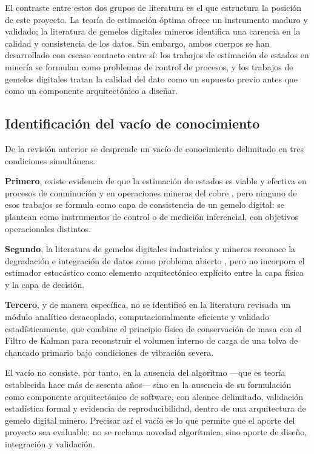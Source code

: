 El contraste entre estos dos grupos de literatura es el que estructura la
posición de este proyecto. La teoría de estimación óptima ofrece un instrumento
maduro y validado; la literatura de gemelos digitales mineros identifica una
carencia en la calidad y consistencia de los datos. Sin embargo, ambos cuerpos
se han desarrollado con escaso contacto entre sí: los trabajos de estimación de
estados en minería se formulan como problemas de control de procesos, y los
trabajos de gemelos digitales tratan la calidad del dato como un supuesto previo
antes que como un componente arquitectónico a diseñar.

\subsection{Identificación del vacío de conocimiento}

De la revisión anterior se desprende un vacío de conocimiento delimitado en
tres condiciones simultáneas.

\textbf{Primero}, existe evidencia de que la estimación de estados es viable y
efectiva en procesos de conminución \parencite{apelt2002} y en operaciones
mineras del cobre \parencite{barzaga2025}, pero ninguno de esos trabajos se
formula como capa de consistencia de un gemelo digital: se plantean como
instrumentos de control o de medición inferencial, con objetivos operacionales
distintos.

\textbf{Segundo}, la literatura de gemelos digitales industriales y mineros
reconoce la degradación e integración de datos como problema abierto
\parencite{fuller2020,ebad2026}, pero no incorpora el estimador estocástico como
elemento arquitectónico explícito entre la capa física y la capa de decisión.

\textbf{Tercero}, y de manera específica, no se identificó en la literatura
revisada un módulo analítico desacoplado, computacionalmente eficiente y
validado estadísticamente, que combine el principio físico de conservación de
masa con el Filtro de Kalman para reconstruir el volumen interno de carga de una
tolva de chancado primario bajo condiciones de vibración severa.

El vacío no consiste, por tanto, en la ausencia del algoritmo —que es teoría
establecida hace más de sesenta años— sino en la ausencia de su formulación como
componente arquitectónico de software, con alcance delimitado, validación
estadística formal y evidencia de reproducibilidad, dentro de una arquitectura
de gemelo digital minero. Precisar así el vacío es lo que permite que el aporte
del proyecto sea evaluable: no se reclama novedad algorítmica, sino aporte de
diseño, integración y validación.

